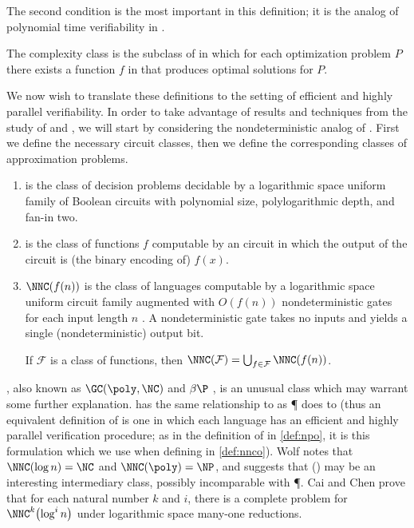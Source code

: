\documentclass[]{article}
\let\originalleft\left
\let\originalright\right
\renewcommand{\left}{\mathopen{}\mathclose\bgroup\originalleft}
\renewcommand{\right}{\aftergroup\egroup\originalright}
\begin{document}
The second condition is the most important in this definition; it is the analog of polynomial time verifiability in \NP.

\begin{definition}
  The complexity class \PO{} is the subclass of \NPO{} in which for each optimization problem $P$ there exists a function $f$ in \FP{} that produces optimal solutions for $P$.
\end{definition}

We now wish to translate these definitions to the setting of efficient and highly parallel verifiability.
In order to take advantage of results and techniques from the study of \NPO{} and \PO, we will start by considering the nondeterministic analog of \PO.
First we define the necessary circuit classes, then we define the corresponding classes of approximation problems.

\begin{definition}
  \mbox{}
  \begin{enumerate}
  \item \NC{} is the class of decision problems decidable by a logarithmic space uniform family of Boolean circuits with polynomial size, polylogarithmic depth, and fan-in two.
  \item \FNC{} is the class of functions $f$ computable by an \NC{} circuit in which the output of the circuit is (the binary encoding of) $f(x)$.
  \item $\NNC(f(n))$ is the class of languages computable by a logarithmic space uniform \NC{} circuit family augmented with $O(f(n))$ nondeterministic gates for each input length $n$ \cite{wolf94}.
    A nondeterministic gate takes no inputs and yields a single (nondeterministic) output bit.

    If $\mathcal{F}$ is a class of functions, then $\NNC(\mathcal{F})=\bigcup_{f\in\mathcal{F}}{\NNC(f(n))}$.
  \end{enumerate}
\end{definition}

\NNCpoly, also known as $\GC(\poly, \NC)$ \cite{cc97} and $\beta\P$ \cite{kf80}, is an unusual class which may warrant some further explanation.
\NC{} has the same relationship to \NNCpoly{} as \P{} does to \NP{} (thus an equivalent definition of \NNCpoly{} is one in which each language has an efficient and highly parallel verification procedure; as in the definition of \NPO{} in \autoref{def:npo}, it is this formulation which we use when defining \NNCO{} in \autoref{def:nnco}).
Wolf \cite{wolf94} notes that $\NNC(\log n)=\NC$ and $\NNC(\poly)=\NP$, and suggests that \NNC(\polylog) may be an interesting intermediary class, possibly incomparable with \P.
Cai and Chen \cite{cc97} prove that for each natural number $k$ and $i$, there is a complete problem for $\NNC^k\left(\log^i n\right)$ under logarithmic space many-one reductions.
\end{document}
